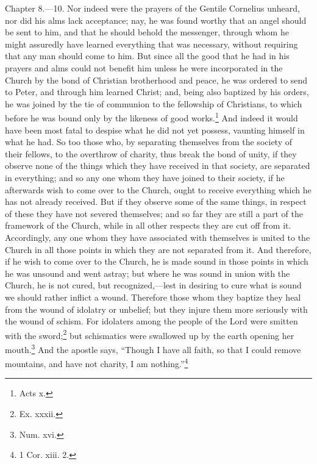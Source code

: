 
Chapter 8.—10. Nor indeed were the prayers of the Gentile Cornelius unheard, nor did his alms lack acceptance; nay, he was found worthy that an angel should be sent to him, and that he should behold the messenger, through whom he might assuredly have learned everything that was necessary, without requiring that any man should come to him. But since all the good that he had in his prayers and alms could not benefit him unless he were incorporated in the Church by the bond of Christian brotherhood and peace, he was ordered to send to Peter, and through him learned Christ; and, being also baptized by his orders, he was joined by the tie of communion to the fellowship of Christians, to which before he was bound only by the likeness of good works.\footnote{\par  Acts x.} And indeed it would have been most fatal to despise what he did not yet possess, vaunting himself in what he had. So too those who, by separating themselves from the society of their fellows, to the overthrow of charity, thus break the bond of unity, if they observe none of the things which they have received in that society, are separated in everything; and so any one whom they have joined to their society, if he afterwards wish to come over to the Church, ought to receive everything which he has not already received. But if they observe some of the same things, in respect of these they have not severed themselves; and so far they are still a part of the framework of the Church, while in all other respects they are cut off from it. Accordingly, any one whom they have associated with themselves is united to the Church in all those points in which they are not separated from it. And therefore, if he wish to come over to the Church, he is made sound in those points in which he was unsound and went astray; but where he was sound in union with the Church, he is not cured, but recognized,—lest in desiring to cure what is sound we should rather inflict a wound. Therefore those whom they baptize they heal from the wound of idolatry or unbelief; but they injure them more seriously with the wound of schism. For idolaters among the people of the Lord were smitten with the sword;\footnote{\par  Ex. xxxii.} but schismatics were swallowed up by the earth opening her mouth.\footnote{\par  Num. xvi.} And the apostle says, ``Though I have all faith, so that I could remove mountains, and have not charity, I am nothing.''\footnote{\par  1 Cor. xiii. 2.}

